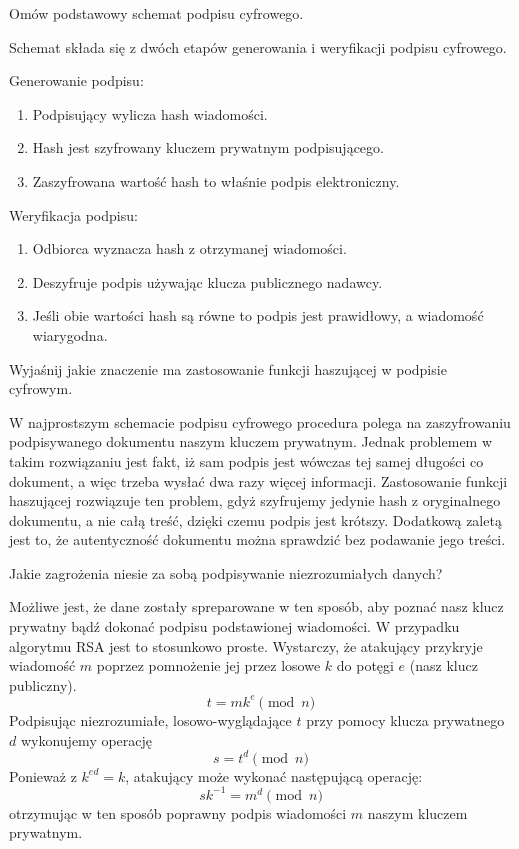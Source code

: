 \documentclass[answers,11pt]{exam}
\begin{document}
\begin{questions}

\question Omów podstawowy schemat podpisu cyfrowego.
\begin{solution}
Schemat składa się z dwóch etapów generowania i weryfikacji podpisu cyfrowego.

Generowanie podpisu:
\begin{enumerate}
\item Podpisujący wylicza hash wiadomości.
\item Hash jest szyfrowany kluczem prywatnym podpisującego.
\item Zaszyfrowana wartość hash to właśnie podpis elektroniczny.
\end{enumerate}

Weryfikacja podpisu:
\begin{enumerate}
\item Odbiorca wyznacza hash z otrzymanej wiadomości.
\item Deszyfruje podpis używając klucza publicznego nadawcy.
\item Jeśli obie wartości hash są równe to podpis jest prawidłowy, a wiadomość wiarygodna.
\end{enumerate}
\end{solution}


\question Wyjaśnij jakie znaczenie ma zastosowanie funkcji haszującej w podpisie cyfrowym.
\begin{solution}
W najprostszym schemacie podpisu cyfrowego procedura polega na zaszyfrowaniu podpisywanego dokumentu naszym kluczem prywatnym. Jednak problemem w takim rozwiązaniu jest fakt, iż sam podpis jest wówczas tej samej długości co dokument, a więc trzeba wysłać dwa razy więcej informacji. Zastosowanie funkcji haszującej rozwiązuje ten problem, gdyż szyfrujemy jedynie hash z oryginalnego dokumentu, a nie całą treść, dzięki czemu podpis jest krótszy. Dodatkową zaletą jest to, że autentyczność dokumentu można sprawdzić bez podawanie jego treści.
\end{solution}


\question Jakie zagrożenia niesie za sobą podpisywanie niezrozumiałych danych?
\begin{solution}
Możliwe jest, że dane zostały spreparowane w ten sposób, aby poznać nasz klucz prywatny bądź dokonać podpisu podstawionej wiadomości. W przypadku algorytmu RSA jest to stosunkowo proste. Wystarczy, że atakujący przykryje wiadomość $m$ poprzez pomnożenie jej przez losowe $k$ do potęgi $e$ (nasz klucz publiczny). 
\begin{equation}
t = m k^e \pmod{n}
\end{equation}
Podpisując niezrozumiałe, losowo-wyglądające $t$ przy pomocy klucza prywatnego $d$ wykonujemy operację
\begin{equation}
s = t^d \pmod{n}
\end{equation}
Ponieważ z $k^{ed} = k$, atakujący może wykonać następującą operację:
\begin{equation}
sk^{-1} = m^d \pmod{n}
\end{equation}
otrzymując w ten sposób poprawny podpis wiadomości $m$ naszym kluczem prywatnym.
\end{solution}


\end{questions}
\end{document}

